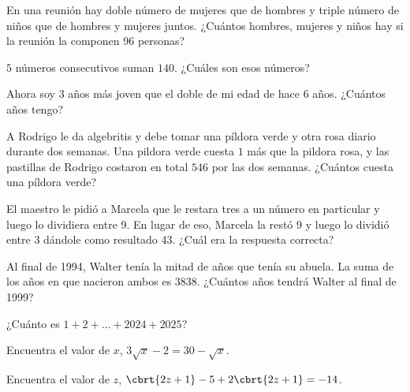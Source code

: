 \begin{problem}[$2 \clubsuit$]
    En una reunión hay doble número de mujeres que de hombres y 
    triple número de niños que de hombres y mujeres juntos. 
    ¿Cuántos hombres, mujeres y niños hay si la reunión la 
    componen 96 personas?
\end{problem}

\begin{problem}[$2 \clubsuit$]
    $5$ números consecutivos suman $140$. 
    ¿Cuáles son esos números?
\end{problem}

\begin{problem}[$2 \clubsuit$]
    Ahora soy $3$ años más joven que el doble de mi edad de 
    hace $6$ años. ¿Cuántos años tengo?
\end{problem}

\begin{problem}
    A Rodrigo le da algebritis y debe tomar una píldora verde 
    y otra rosa diario durante dos semanas. Una pildora 
    verde cuesta $1$ más que la pildora rosa, y las pastillas de 
    Rodrigo costaron en total $546$ por las dos semanas. 
    ¿Cuántos cuesta una píldora verde? 
\end{problem}

\begin{problem}
    El maestro le pidió a Marcela que le restara tres a un 
    número en particular y luego lo dividiera entre 9. En lugar de eso, 
    Marcela la restó 9 y luego lo dividió entre 3 dándole como 
    resultado 43. ¿Cuál era la respuesta correcta?
\end{problem}

\begin{problem}
    Al final de 1994, Walter tenía la mitad de años que tenía su 
    abuela. La suma de los años en que nacieron ambos es 3838. 
    ¿Cuántos años tendrá Walter al final de 1999?
\end{problem}

\begin{dproblem}[$5 \clubsuit$]
    ¿Cuánto es $1+2+\dots+2024+2025$?
\end{dproblem}

\begin{dproblem}[$4 \clubsuit$]
    Encuentra el valor de $x$, $3\sqrt{x}-2=30-\sqrt{x}$.
\end{dproblem}

\begin{problem}[$4 \clubsuit$]
    Encuentra el valor de $z$, $\cbrt{2z+1}-5+2\cbrt{2z+1}
    =-14$.
\end{problem}

